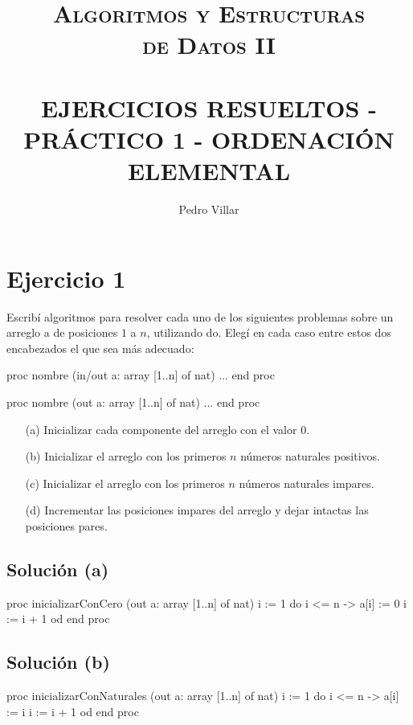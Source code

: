 \documentclass{article}
\title{ \normalsize \textsc{Algoritmos y Estructuras\\
de Datos II}
		\\ [2.0cm]
		\HRule \\
		\LARGE \textbf{\uppercase{Ejercicios Resueltos - Práctico 1 - Ordenación Elemental}}
		\HRule \\ [0.5cm]
		\normalsize  \vspace*{5\baselineskip}}
\date{}
\author{Pedro Villar}
\begin{document}
\newcommand{\HRule}{\rule{\linewidth}{0.5pt}} %
\maketitle
\newpage
\section{Ejercicio 1}
Escribí algoritmos para resolver cada uno de los siguientes problemas sobre un arreglo a de posiciones $1$ a $n$, utilizando do. Elegí en cada caso entre estos dos encabezados el que sea más adecuado:

\begin{codebox}
\begin{pascallike}
proc nombre (in/out a: array [1..n] of nat)
    ...
end proc
\end{pascallike}
\end{codebox}
\begin{codebox}
\begin{pascallike}
proc nombre (out a: array [1..n] of nat)
    ...
end proc
\end{pascallike}
\end{codebox}
\begin{itemize}
    \item[(a)] Inicializar cada componente del arreglo con el valor $0$.
    \item[(b)] Inicializar el arreglo con los primeros $n$ números naturales positivos.
    \item[(c)] Inicializar el arreglo con los primeros $n$ números naturales impares.
    \item[(d)] Incrementar las posiciones impares del arreglo y dejar intactas las posiciones pares.  
\end{itemize}

\subsection{Solución (a)}
\begin{codebox}
\begin{pascallike}
proc inicializarConCero (out a: array [1..n] of nat)
    i := 1
    do i <= n -> 
    a[i] := 0
    i := i + 1
    od
end proc
\end{pascallike}
\end{codebox}

\subsection{Solución (b)}
\begin{codebox}
\begin{pascallike}
proc inicializarConNaturales (out a: array [1..n] of nat)
    i := 1
    do i <= n -> 
    a[i] := i
    i := i + 1
    od
end proc
\end{pascallike}
\end{codebox}
\end{document}
